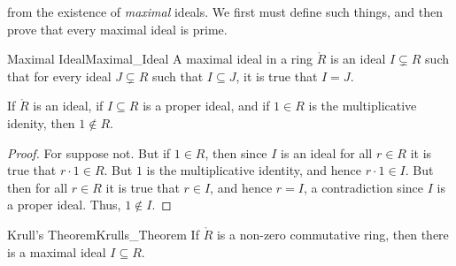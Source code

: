 \documentclass{article}                                                        %
\begin{document}
        from the existence of \textit{maximal} ideals. We first must define such
        things, and then prove that every maximal ideal is prime.
        \begin{fdefinition}{Maximal Ideal}{Maximal_Ideal}
            A maximal ideal in a ring $\ring{R}$ is an ideal $I\subsetneq{R}$
            such that for every ideal $J\subsetneq{R}$ such that
            $I\subseteq{J}$, it is true that $I=J$.
        \end{fdefinition}
        \begin{theorem}
            \label{thm:Proper_Ideal_Does_Not_Contain_1}%
            If $\ring{R}$ is an ideal, if $I\subseteq{R}$ is a proper ideal, and
            if $1\in{R}$ is the multiplicative idenity, then $1\notin{R}$.
        \end{theorem}
        \begin{proof}
            For suppose not. But if $1\in{R}$, then since $I$ is an ideal for
            all $r\in{R}$ it is true that $r\cdot{1}\in{R}$. But $1$ is the
            multiplicative identity, and hence $r\cdot{1}\in{I}$. But then for
            all $r\in{R}$ it is true that $r\in{I}$, and hence $r=I$, a
            contradiction since $I$ is a proper ideal. Thus, $1\notin{I}$.
        \end{proof}
        \begin{ftheorem}{Krull's Theorem}{Krulls_Theorem}
            If $\ring{R}$ is a non-zero commutative ring, then there is a
            maximal ideal $I\subseteq{R}$.
        \end{ftheorem}
\end{document}
